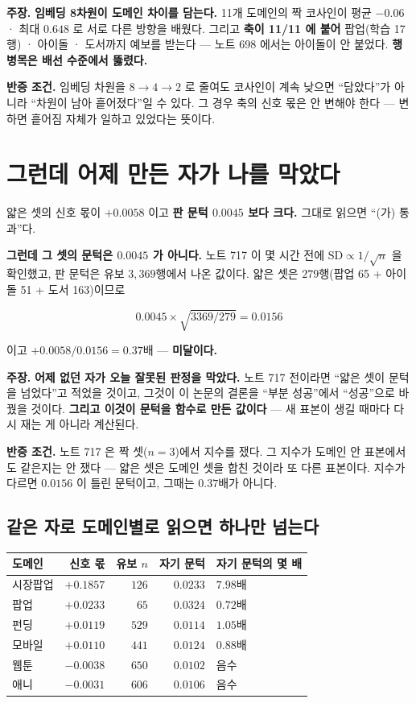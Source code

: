 \documentclass[10pt,a4paper]{article}
\newcommand{\claim}[2]{\begin{claimbox}\textbf{주장.} #1\par\smallskip
  \textcolor{gray!70}{\textbf{반증 조건.} #2}\end{claimbox}}
\begin{document}
\claim{\textbf{임베딩 8차원이 도메인 차이를 담는다.} 11개 도메인의 짝 코사인이
평균 $-0.06$ · 최대 $0.648$ 로 서로 다른 방향을 배웠다. 그리고 \textbf{축이 11/11 에
붙어} 팝업(학습 17행) · 아이돌 · 도서까지 예보를 받는다 --- 노트 698 에서는
아이돌이 안 붙었다. \textbf{행 병목은 배선 수준에서 뚫렸다.}}
{임베딩 차원을 $8 \to 4 \to 2$ 로 줄여도 코사인이 계속 낮으면 ``담았다''가 아니라
``차원이 남아 흩어졌다''일 수 있다. 그 경우 축의 신호 몫은 안 변해야 한다 ---
변하면 흩어짐 자체가 일하고 있었다는 뜻이다.}

\section{그런데 어제 만든 자가 나를 막았다}

얇은 셋의 신호 몫이 $+0.0058$ 이고 \textbf{판 문턱 $0.0045$ 보다 크다.} 그대로
읽으면 ``(가) 통과''다.

\textbf{그런데 그 셋의 문턱은 $0.0045$ 가 아니다.} 노트 717 이 몇 시간 전에
$\text{SD} \propto 1/\sqrt{n}$ 을 확인했고, 판 문턱은 유보 $3{,}369$행에서 나온
값이다. 얇은 셋은 $279$행(팝업 65 + 아이돌 51 + 도서 163)이므로

\[ 0.0045 \times \sqrt{3369/279} = \mathbf{0.0156} \]

이고 $+0.0058 / 0.0156 = \mathbf{0.37}$배 --- \textbf{미달이다.}

\claim{\textbf{어제 없던 자가 오늘 잘못된 판정을 막았다.} 노트 717 전이라면
``얇은 셋이 문턱을 넘었다''고 적었을 것이고, 그것이 이 논문의 결론을
``부분 성공''에서 ``성공''으로 바꿨을 것이다. \textbf{그리고 이것이 문턱을 함수로
만든 값이다} --- 새 표본이 생길 때마다 다시 재는 게 아니라 계산된다.}
{노트 717 은 짝 셋($n=3$)에서 지수를 쟀다. 그 지수가 도메인 안 표본에서도
같은지는 안 쟀다 --- 얇은 셋은 도메인 셋을 합친 것이라 또 다른 표본이다. 지수가
다르면 $0.0156$ 이 틀린 문턱이고, 그때는 $0.37$배가 아니다.}

\subsection*{같은 자로 도메인별로 읽으면 하나만 넘는다}

\begin{center}
\begin{tabular}{lrrrl}
\toprule
도메인 & 신호 몫 & 유보 $n$ & 자기 문턱 & 자기 문턱의 몇 배 \\
\midrule
시장팝업 & $+0.1857$ & $126$ & $0.0233$ & $\mathbf{7.98}$배 \\
팝업 & $+0.0233$ & $65$ & $0.0324$ & $0.72$배 \\
펀딩 & $+0.0119$ & $529$ & $0.0114$ & $1.05$배 \\
모바일 & $+0.0110$ & $441$ & $0.0124$ & $0.88$배 \\
\midrule
웹툰 & $\mathbf{-0.0038}$ & $650$ & $0.0102$ & 음수 \\
애니 & $-0.0031$ & $606$ & $0.0106$ & 음수 \\
\bottomrule
\end{tabular}
\end{center}
\end{document}
